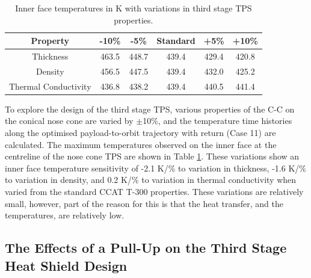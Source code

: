 \begin{table}[!ht]
	\centering
	\begin{tabular}{|c|c|c|c|c|c|}
		\hline Property & -10\% & -5\% & Standard & +5\% & +10\% \\ 
		\hline Thickness & 463.5 & 448.7 & 439.4 &  429.4 & 420.8  \\ 
		\hline Density &  456.5 & 447.5 & 439.4 & 432.0 &  425.2\\ 
		\hline Thermal Conductivity & 436.8 & 438.2 & 439.4 & 440.5 & 441.4 \\ 
		\hline 
	\end{tabular} 
	
	\caption{Inner face temperatures in K with variations in third stage TPS properties.}
	\label{tab:tpsthirdstage}
\end{table}

To explore the design of the third stage TPS, various properties of the C-C on the conical nose cone are varied by $\pm$10\%, and the temperature time histories along the optimised payload-to-orbit trajectory with return (Case 11) are calculated. The maximum temperatures observed on the inner face at the centreline of the nose cone TPS are shown in Table \ref{tab:tpsthirdstage}. These variations show an inner face temperature sensitivity of -2.1 K/\% to variation in thickness, -1.6 K/\% to variation in density, and 0.2 K/\% to variation in thermal conductivity when varied from the standard CCAT T-300 properties. These variations are relatively small, however, part of the reason for this is that the heat transfer, and the temperatures, are relatively low. 






\subsection{The Effects of a Pull-Up on the Third Stage Heat Shield Design}


